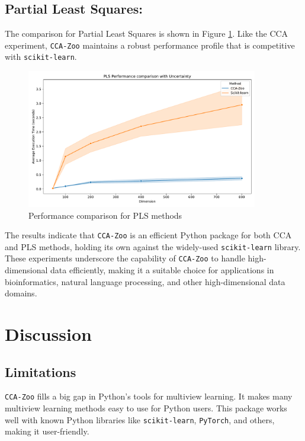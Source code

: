 \subsection{Partial Least Squares:}
The comparison for Partial Least Squares is shown in Figure \ref{fig:pls_benchmark}.
Like the CCA experiment, \texttt{CCA-Zoo} maintains a robust performance profile that is competitive with \texttt{scikit-learn}.

\begin{figure}[h]
    \centering
    \includegraphics[width=0.9\textwidth]{figures/PLS_Speed_Benchmark}
    \caption{Performance comparison for PLS methods}
    \label{fig:pls_benchmark}
\end{figure}

The results indicate that \texttt{CCA-Zoo} is an efficient Python package for both CCA and PLS methods, holding its own against the widely-used \texttt{scikit-learn} library.
These experiments underscore the capability of \texttt{CCA-Zoo} to handle high-dimensional data efficiently, making it a suitable choice for applications in bioinformatics, natural language processing, and other high-dimensional data domains.

\section{Discussion}

\subsection{Limitations}

\texttt{CCA-Zoo} fills a big gap in Python's tools for multiview learning.
It makes many multiview learning methods easy to use for Python users.
This package works well with known Python libraries like \texttt{scikit-learn}, \texttt{PyTorch}, and others, making it user-friendly.

